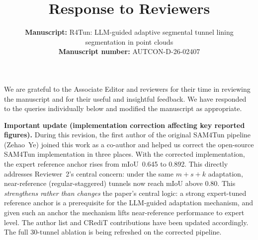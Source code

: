 \documentclass[11pt,a4paper]{article}
\title{Response to Reviewers}
\author{%
  \parbox{\textwidth}{%
    \textbf{Manuscript:} R4Tun: LLM-guided adaptive segmental tunnel lining segmentation in point clouds\\[0.4em]
    \textbf{Manuscript number:} AUTCON-D-26-02407
  }%
}
\date{}
\newcommand{\MSRuntimeTable}{Table~7}
\newcommand{\MSErrorCompositionTable}{Table~9}
\newcommand{\MSSOTATable}{Table~10}
\newcommand{\MSErrorMechanismFigure}{Fig.~11}
\newcommand{\MSErrorMapFigure}{Fig.~12}
\newcommand{\MSAppendixRepeatability}{Appendix~7}
\begin{document}
\maketitle

We are grateful to the Associate Editor and reviewers for their time in reviewing the manuscript and for their useful and insightful feedback. We have responded to the queries individually below and modified the manuscript as appropriate.

\textbf{Important update (implementation correction affecting key reported figures).} During this revision, the first author of the original SAM4Tun pipeline (Zehao~Ye) joined this work as a co-author and helped us correct the open-source SAM4Tun implementation in three places. With the corrected implementation, the expert reference anchor rises from mIoU~0.645 to 0.892. This directly addresses Reviewer~2's central concern: under the same $m+s+k$ adaptation, near-reference (regular-staggered) tunnels now reach mIoU above 0.80. This \emph{strengthens rather than changes} the paper's central logic: a strong expert-tuned reference anchor is a prerequisite for the LLM-guided adaptation mechanism, and given such an anchor the mechanism lifts near-reference performance to expert level. The author list and CRediT contributions have been updated accordingly. The full 30-tunnel ablation is being refreshed on the corrected pipeline.

\end{document}
